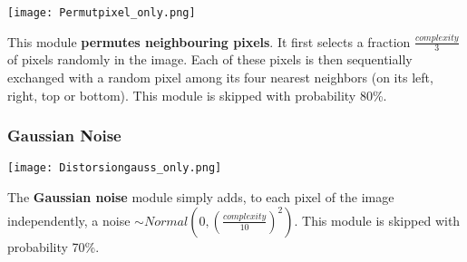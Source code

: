 \documentclass[smallcondensed]{svjour3}     %
\begin{document}
\begin{minipage}[t]{0.14\textwidth}
\begin{center}
\vspace*{1mm}
\texttt{[image: Permutpixel\_only.png]}
\end{center}
\end{minipage}%
\hspace{3mm}\begin{minipage}[t]{0.86\linewidth}
\vspace*{1mm}
This module {\bf permutes neighbouring pixels}. It first selects a
fraction $\frac{complexity}{3}$ of pixels randomly in the image. Each
of these pixels is then sequentially exchanged with a random pixel
among its four nearest neighbors (on its left, right, top or bottom).
This module is skipped with probability 80\%.\\
\end{minipage}


\subsubsection*{Gaussian Noise}

\begin{minipage}[t]{0.14\textwidth}
\begin{center}
\vspace*{0mm}
\texttt{[image: Distorsiongauss\_only.png]}
\end{center}
\end{minipage}%
\hspace{0.3cm}\begin{minipage}[t]{0.86\linewidth}
\vspace*{1mm}
The {\bf Gaussian noise} module simply adds, to each pixel of the image independently, a
noise $\sim Normal(0,(\frac{complexity}{10})^2)$.
This module is skipped with probability 70\%.
\end{minipage}
\end{document}
